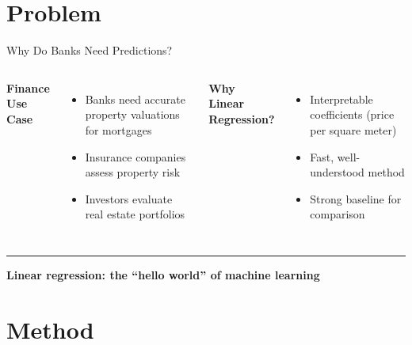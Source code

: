 \documentclass[8pt,aspectratio=169]{beamer}
\newcommand{\bottomnote}[1]{%
\vfill
\vspace{-2mm}
\textcolor{mllavender2}{\rule{\textwidth}{0.4pt}}
\vspace{1mm}
\footnotesize
\textbf{#1}
}
\begin{document}
\section{Problem}

\begin{frame}[t]{Why Do Banks Need Predictions?}
\begin{columns}[T]
\textbf{Finance Use Case}

\begin{itemize}
  \item Banks need accurate property valuations for mortgages
  \item Insurance companies assess property risk
  \item Investors evaluate real estate portfolios
\end{itemize}

\textbf{Why Linear Regression?}

\begin{itemize}
  \item Interpretable coefficients (price per square meter)
  \item Fast, well-understood method
  \item Strong baseline for comparison
\end{itemize}
\end{columns}

\bottomnote{Linear regression: the ``hello world'' of machine learning}
\end{frame}

\section{Method}
\end{document}
